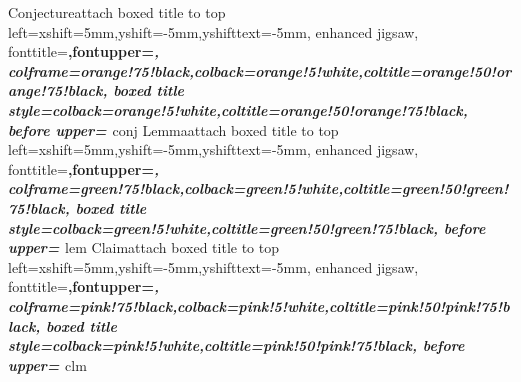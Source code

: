 %
{Conjecture}{attach boxed title to top 	left={xshift=5mm,yshift=-5mm,yshifttext=-5mm},
	enhanced jigsaw,
	fonttitle=\bfseries\large,fontupper=\slshape,
	colframe=orange!75!black,colback=orange!5!white,coltitle=orange!50!orange!75!black,
	boxed title style={colback=orange!5!white,coltitle=orange!50!orange!75!black},
	before upper={
	}
}{conj}%
%
{Lemma}{attach boxed title to top 	left={xshift=5mm,yshift=-5mm,yshifttext=-5mm},
	enhanced jigsaw,
	fonttitle=\bfseries\large,fontupper=\itshape,
	colframe=green!75!black,colback=green!5!white,coltitle=green!50!green!75!black,
	boxed title style={colback=green!5!white,coltitle=green!50!green!75!black},
	before upper={
	}
}{lem}%
%
{Claim}{attach boxed title to top 	left={xshift=5mm,yshift=-5mm,yshifttext=-5mm},
	enhanced jigsaw,
	fonttitle=\bfseries\large,fontupper=\itshape,
	colframe=pink!75!black,colback=pink!5!white,coltitle=pink!50!pink!75!black,
	boxed title style={colback=pink!5!white,coltitle=pink!50!pink!75!black},
	before upper={
	}
}{clm}%